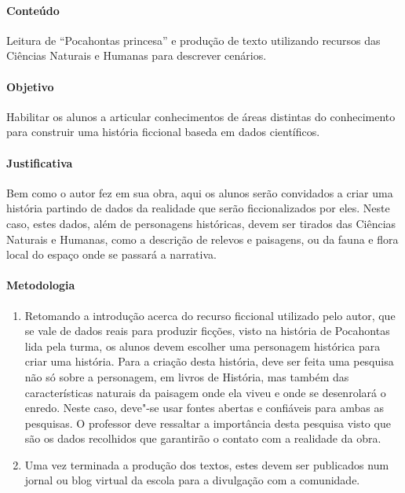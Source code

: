 \documentclass[12pt]{extarticle}
\begin{document}
 \paragraph{Conteúdo} Leitura de ``Pocahontas princesa'' e produção de texto
 utilizando recursos das Ciências Naturais e Humanas para descrever cenários.

 \paragraph{Objetivo} Habilitar os alunos a articular conhecimentos de áreas
 distintas do conhecimento para construir uma história ficcional baseda
 em dados científicos.

 \paragraph{Justificativa} Bem como o autor fez em sua obra, aqui os alunos
 serão convidados a criar uma história partindo de dados da realidade que
 serão ficcionalizados por eles. Neste caso, estes dados, além de personagens
 históricas, devem ser tirados das Ciências Naturais e Humanas, como a descrição de
 relevos e paisagens, ou da fauna e flora local do espaço onde se passará a narrativa.

 \paragraph{Metodologia}
 	\begin{enumerate}
 		\item
 		Retomando a introdução acerca do recurso ficcional utilizado pelo
 		autor, que se vale de dados reais para produzir ficções, visto na história 
 		de Pocahontas lida pela turma, os alunos devem escolher uma personagem 
 		histórica para criar uma história. 
 		Para a criação desta história, deve ser feita uma pesquisa não só sobre
 		a personagem, em livros de História, mas também das características 
 		naturais da paisagem onde ela viveu e onde se desenrolará o enredo.
 		Neste caso, deve"-se usar fontes abertas e confiáveis para ambas as pesquisas.
 		O professor deve ressaltar a importância desta pesquisa visto que são os dados
 		recolhidos que garantirão o contato com a realidade da obra.
 		\item
 		Uma vez terminada a produção dos textos, estes devem ser publicados 
 		num jornal ou blog virtual da escola para a divulgação com a comunidade.
 	\end{enumerate}
\end{document}
